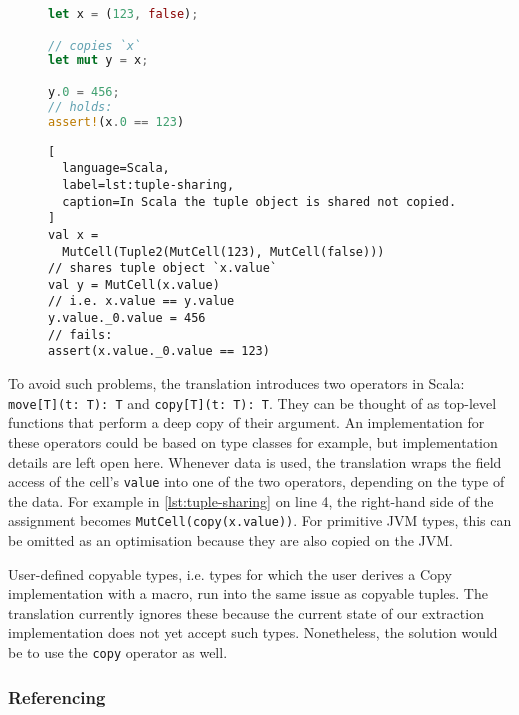 \begin{figure}
\noindent\begin{minipage}[t]{.3\textwidth}
\begin{lstlisting}[language=Rust, caption={The tuple is copied on line 2.}, label={lst:tuple-share}]
let x = (123, false);

// copies `x`
let mut y = x;

y.0 = 456;
// holds:
assert!(x.0 == 123)
\end{lstlisting}
\end{minipage}\hfill
\begin{minipage}[t]{.67\textwidth}
\begin{lstlisting}[
  language=Scala,
  label=lst:tuple-sharing,
  caption=In Scala the tuple object is shared not copied.
]
val x =
  MutCell(Tuple2(MutCell(123), MutCell(false)))
// shares tuple object `x.value`
val y = MutCell(x.value)
// i.e. x.value == y.value
y.value._0.value = 456
// fails:
assert(x.value._0.value == 123)
\end{lstlisting}
\end{minipage}
\end{figure}


To avoid such problems, the translation introduces two operators in Scala:
\passthrough{\lstinline!move[T](t: T): T!} and
\passthrough{\lstinline!copy[T](t: T): T!}. They can be thought of as top-level
functions that perform a deep copy of their argument. An implementation for
these operators could be based on type classes for example, but implementation
details are left open here. Whenever data is used, the translation wraps the
field access of the cell's \lstinline!value! into one of the two operators,
depending on the type of the data. For example in \autoref{lst:tuple-sharing} on
line 4, the right-hand side of the assignment becomes
\lstinline!MutCell(copy(x.value))!. For primitive JVM types, this can be omitted
as an optimisation because they are also copied on the JVM.

User-defined copyable types, i.e. types for which the user derives a Copy
implementation with a macro, run into the same issue as copyable tuples. The
translation currently ignores these because the current state of our extraction
implementation does not yet accept such types. Nonetheless, the solution would
be to use the \lstinline!copy! operator as well.

\subsubsection{Referencing}

